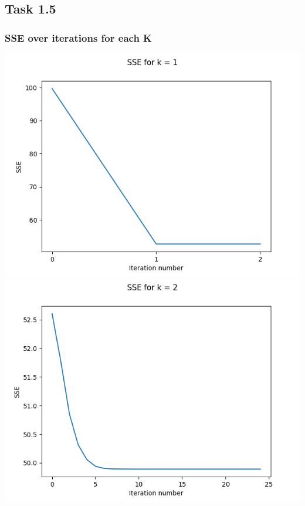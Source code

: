 \documentclass{article}
\begin{document}
\subsection*{Task 1.5}

\subsubsection*{SSE over iterations for each K}

\begin{center}
    \includegraphics[scale=0.4]{images/task1_5_graph_1.png}
    \includegraphics[scale=0.4]{images/task1_5_graph_2.png}
\end{center}
\vspace{0.2cm}
\end{document}
